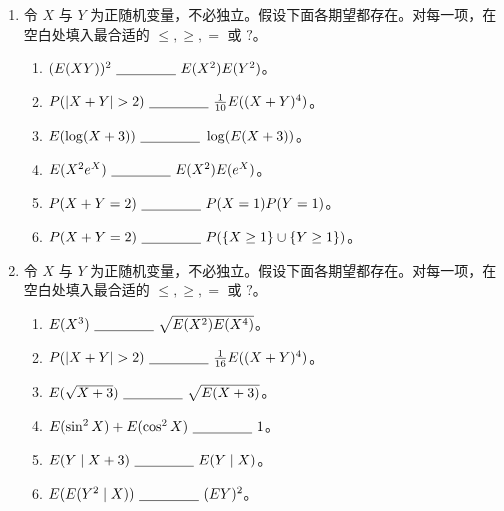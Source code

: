 \documentclass[UTF8,12pt,a4paper,fontset=fandol]{ctexart}
\begin{document}
\begin{enumerate}
  \item 令 $X$ 与 $Y$ 为正随机变量，不必独立。假设下面各期望都存在。对每一项，在空白处填入最合适的 $\le,\ge,=$ 或 $?$。
  \begin{enumerate}
    \item $(E(XY))^2\ \underline{\hspace{1.5cm}}\ E(X^2)E(Y^2)$。
    \item $P(|X+Y|>2)\ \underline{\hspace{1.5cm}}\ \frac1{10}E((X+Y)^4)$。
    \item $E(\log(X+3))\ \underline{\hspace{1.5cm}}\ \log(E(X+3))$。
    \item $E(X^2e^X)\ \underline{\hspace{1.5cm}}\ E(X^2)E(e^X)$。
    \item $P(X+Y=2)\ \underline{\hspace{1.5cm}}\ P(X=1)P(Y=1)$。
    \item $P(X+Y=2)\ \underline{\hspace{1.5cm}}\ P(\{X\ge 1\}\cup\{Y\ge 1\})$。
  \end{enumerate}

  \item 令 $X$ 与 $Y$ 为正随机变量，不必独立。假设下面各期望都存在。对每一项，在空白处填入最合适的 $\le,\ge,=$ 或 $?$。
  \begin{enumerate}
    \item $E(X^3)\ \underline{\hspace{1.5cm}}\ \sqrt{E(X^2)E(X^4)}$。
    \item $P(|X+Y|>2)\ \underline{\hspace{1.5cm}}\ \frac1{16}E((X+Y)^4)$。
    \item $E(\sqrt{X+3})\ \underline{\hspace{1.5cm}}\ \sqrt{E(X+3)}$。
    \item $E(\sin^2 X)+E(\cos^2 X)\ \underline{\hspace{1.5cm}}\ 1$。
    \item $E(Y\mid X+3)\ \underline{\hspace{1.5cm}}\ E(Y\mid X)$。
    \item $E(E(Y^2\mid X))\ \underline{\hspace{1.5cm}}\ (EY)^2$。
  \end{enumerate}


\end{enumerate}
\end{document}
